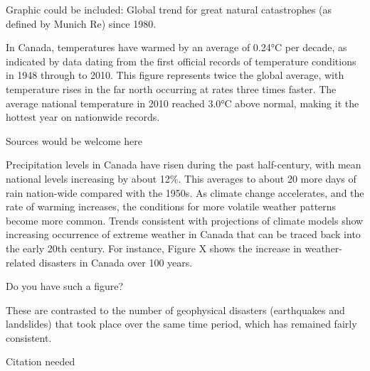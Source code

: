 \begin{vcom}
Graphic could be included: Global trend for great natural catastrophes (as defined by Munich Re) since 1980.
\end{vcom}



In Canada, temperatures have warmed by an average of 0.24°C per decade, as indicated by data dating from the first official records of temperature conditions in 1948 through to 2010. 
This figure represents twice the global average, with temperature rises in the far north occurring at rates three times faster. 
The average national temperature in 2010 reached 3.0°C above normal, making it the hottest year on nationwide records.

\begin{vcom}
Sources would be welcome here
\end{vcom}


Precipitation levels in Canada have risen during the past half-century, with mean national levels increasing by about 12\%. 
This averages to about 20 more days of rain nation-wide compared with the 1950s. 
As climate change accelerates, and the rate of warming increases, the conditions for more volatile weather patterns become more common. 
Trends consistent with projections of climate models show increasing occurrence of extreme weather in Canada that can be traced back into the early 20th century. 
For instance, Figure X shows the increase in weather-related disasters in Canada over 100 years. 

\begin{vcom}
Do you have such a figure?
\end{vcom}

These are contrasted to the number of geophysical disasters (earthquakes and landslides) that took place over the same time period, which has remained fairly consistent.

\begin{vcom}
Citation needed
\end{vcom}



